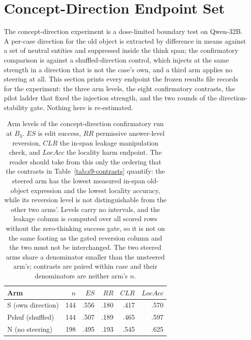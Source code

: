 \documentclass[letterpaper]{article}
\begin{document}
\section{Concept-Direction Endpoint Set}
The concept-direction experiment is a dose-limited boundary test on Qwen-32B.  A
per-case direction for the old object is extracted by difference in means against
a set of neutral entities and suppressed inside the think span; the confirmatory
comparison is against a shuffled-direction control, which injects at the same
strength in a direction that is not the case's own, and a third arm applies no
steering at all.  This section prints every endpoint the frozen results file
records for the experiment: the three arm levels, the eight confirmatory
contrasts, the pilot ladder that fixed the injection strength, and the two rounds
of the direction-stability gate.  Nothing here is re-estimated.

\begin{table}[t]
\centering
\small
\begin{tabular}{@{}lrrrrr@{}}
\toprule
Arm & \(n\) & \(ES\) & \(RR\) & \(CLR\) & \(LocAcc\) \\
\midrule
S (own direction)     & 144 & .556 & .180 & .417 & .570 \\
Pshuf (shuffled)      & 144 & .507 & .189 & .465 & .597 \\
N (no steering)       & 198 & .495 & .193 & .545 & .625 \\
\bottomrule
\end{tabular}
\caption{Arm levels of the concept-direction confirmatory run at \(B_3\).
\(ES\) is edit success, \(RR\) permissive answer-level reversion, \(CLR\) the
in-span leakage manipulation check, and \(LocAcc\) the locality harm endpoint.
The reader should take from this only the ordering that the contrasts in
Table~\ref{tab:s9-contrasts} quantify: the steered arm has the lowest measured
in-span old-object expression and the lowest locality accuracy, while its
reversion level is not distinguishable from the other two arms'.  Levels carry
no intervals, and the leakage column is computed over all scored rows without
the zero-thinking success gate, so it is not on the same footing as the gated
reversion column and the two must not be interchanged.  The two steered arms
share a denominator smaller than the unsteered arm's; contrasts are paired
within case and their denominators are neither arm's \(n\).}
\label{tab:s9-arms}
\end{table}
\end{document}
